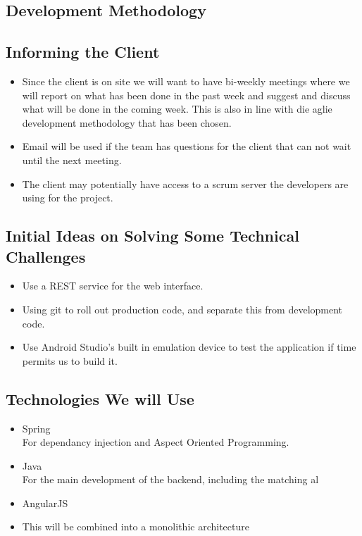 \subsection{Development Methodology}


\subsection{Informing the Client}
\begin{itemize}
	\item Since the client is on site we will want to have bi-weekly meetings where we will report on what has been done in the past week and suggest and discuss what will be done in the coming week. This is also in line with die aglie development methodology that has been chosen.
	\item Email will be used if the team has questions for the client that can not wait until the next meeting.
	\item The client may potentially have access to a scrum server the developers are using for the project.
\end{itemize}

\subsection{Initial Ideas on Solving Some Technical Challenges}
\begin{itemize}
	\item Use a REST service for the web interface.
	\item Using git to roll out production code, and separate this from development code.
	\item Use Android Studio's built in emulation device to test the application if time permits us to build it.
\end{itemize}

\subsection{Technologies We will Use}
\begin{itemize}
	\item Spring\\
	For dependancy injection and Aspect Oriented Programming.
	\item Java\\
	For the main development of the backend, including the matching al
	\item AngularJS
	\item This will be combined into a monolithic architecture\\
\end{itemize}

